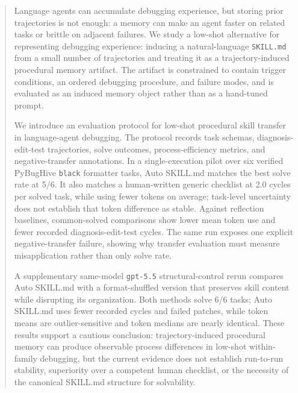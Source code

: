 \begin{abstract}
Language agents can accumulate debugging experience, but storing prior trajectories is not enough: a memory can make an agent faster on related tasks or brittle on adjacent failures. We study a low-shot alternative for representing debugging experience: inducing a natural-language \texttt{SKILL.md} from a small number of trajectories and treating it as a trajectory-induced procedural memory artifact. The artifact is constrained to contain trigger conditions, an ordered debugging procedure, and failure modes, and is evaluated as an induced memory object rather than as a hand-tuned prompt.

We introduce an evaluation protocol for low-shot procedural skill transfer in language-agent debugging. The protocol records task schemas, diagnosis-edit-test trajectories, solve outcomes, process-efficiency metrics, and negative-transfer annotations. In a single-execution pilot over six verified PyBugHive \texttt{black} formatter tasks, Auto SKILL.md matches the best solve rate at 5/6. It also matches a human-written generic checklist at 2.0 cycles per solved task, while using fewer tokens on average; task-level uncertainty does not establish that token difference as stable. Against reflection baselines, common-solved comparisons show lower mean token use and fewer recorded diagnosis-edit-test cycles. The same run exposes one explicit negative-transfer failure, showing why transfer evaluation must measure misapplication rather than only solve rate.

A supplementary same-model \texttt{gpt-5.5} structural-control rerun compares Auto SKILL.md with a format-shuffled version that preserves skill content while disrupting its organization. Both methods solve 6/6 tasks; Auto SKILL.md uses fewer recorded cycles and failed patches, while token means are outlier-sensitive and token medians are nearly identical. These results support a cautious conclusion: trajectory-induced procedural memory can produce observable process differences in low-shot within-family debugging, but the current evidence does not establish run-to-run stability, superiority over a competent human checklist, or the necessity of the canonical SKILL.md structure for solvability.
\end{abstract}
